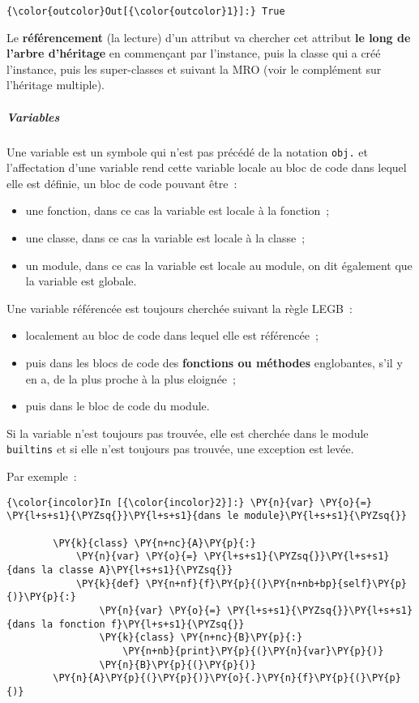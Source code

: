 \begin{Verbatim}[commandchars=\\\{\}]
{\color{outcolor}Out[{\color{outcolor}1}]:} True
\end{Verbatim}
            
    Le \textbf{référencement} (la lecture) d'un attribut va chercher cet
attribut \textbf{le long de l'arbre d'héritage} en commençant par
l'instance, puis la classe qui a créé l'instance, puis les super-classes
et suivant la MRO (voir le complément sur l'héritage multiple).

    \hypertarget{variables}{%
\subparagraph{Variables}\label{variables}}

    Une variable est un symbole qui n'est pas précédé de la notation
\texttt{obj.} et l'affectation d'une variable rend cette variable locale
au bloc de code dans lequel elle est définie, un bloc de code pouvant
être~:

\begin{itemize}
\tightlist
\item
  une fonction, dans ce cas la variable est locale à la fonction~;
\item
  une classe, dans ce cas la variable est locale à la classe~;
\item
  un module, dans ce cas la variable est locale au module, on dit
  également que la variable est globale.
\end{itemize}

Une variable référencée est toujours cherchée suivant la règle LEGB~:

\begin{itemize}
\tightlist
\item
  localement au bloc de code dans lequel elle est référencée~;
\item
  puis dans les blocs de code des \textbf{fonctions ou méthodes}
  englobantes, s'il y en a, de la plus proche à la plus eloignée~;
\item
  puis dans le bloc de code du module.
\end{itemize}

Si la variable n'est toujours pas trouvée, elle est cherchée dans le
module \texttt{builtins} et si elle n'est toujours pas trouvée, une
exception est levée.

Par exemple~:

    \begin{Verbatim}[commandchars=\\\{\}]
{\color{incolor}In [{\color{incolor}2}]:} \PY{n}{var} \PY{o}{=} \PY{l+s+s1}{\PYZsq{}}\PY{l+s+s1}{dans le module}\PY{l+s+s1}{\PYZsq{}}
        
        \PY{k}{class} \PY{n+nc}{A}\PY{p}{:}
            \PY{n}{var} \PY{o}{=} \PY{l+s+s1}{\PYZsq{}}\PY{l+s+s1}{dans la classe A}\PY{l+s+s1}{\PYZsq{}}
            \PY{k}{def} \PY{n+nf}{f}\PY{p}{(}\PY{n+nb+bp}{self}\PY{p}{)}\PY{p}{:}
                \PY{n}{var} \PY{o}{=} \PY{l+s+s1}{\PYZsq{}}\PY{l+s+s1}{dans la fonction f}\PY{l+s+s1}{\PYZsq{}}
                \PY{k}{class} \PY{n+nc}{B}\PY{p}{:}
                    \PY{n+nb}{print}\PY{p}{(}\PY{n}{var}\PY{p}{)}
                \PY{n}{B}\PY{p}{(}\PY{p}{)}
        \PY{n}{A}\PY{p}{(}\PY{p}{)}\PY{o}{.}\PY{n}{f}\PY{p}{(}\PY{p}{)}
\end{Verbatim}


